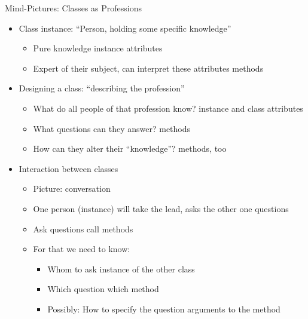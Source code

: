 \begin{frame}[fragile]{Mind-Pictures: Classes as Professions}
%
\begin{itemize}
\item Class instance: \enquote{Person, holding some specific knowledge}
	\begin{itemize}
	\item Pure knowledge \thus instance attributes
	\item Expert of their subject, can interpret these attributes \thus methods
	\end{itemize}
\item Designing a class: \enquote{describing the profession}
	\begin{itemize}
	\item What do all people of that profession know? \thus instance and class attributes
	\item What questions can they answer? \thus methods
	\item How can they alter their \enquote{knowledge}? \thus methods, too
	\end{itemize}
\item Interaction between classes
	\begin{itemize}
	\item Picture: conversation
	\item One person (instance) will take the lead, asks the other one questions
	\item Ask questions \thus call methods
	\item For that we need to know:
		\begin{itemize}
		\item Whom to ask \thus instance of the other class
		\item Which question \thus which method
		\item Possibly: How to specify the question \thus arguments to the method
		\end{itemize}
	\end{itemize}
\end{itemize}
%
\end{frame}


